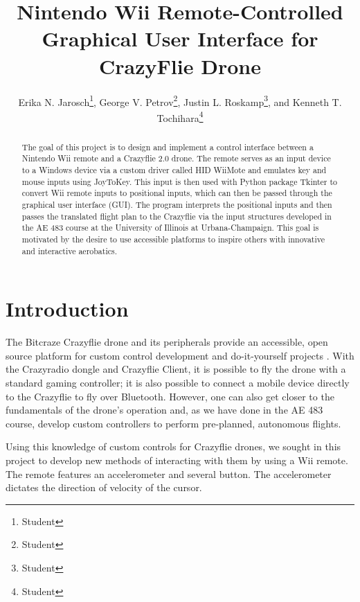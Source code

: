 \documentclass[conf]{new-aiaa}
\title{Nintendo Wii Remote-Controlled Graphical User Interface for CrazyFlie Drone}
\author{Erika N. Jarosch\footnote{Student}, George V. Petrov\footnote{Student}, Justin L. Roskamp\footnote{Student}, and Kenneth T. Tochihara\footnote{Student}}
\affil{University of Illinois at Urbana-Champaign, Urbana, IL, 61820}
\begin{document}
\maketitle
\makenomenclature

\begin{abstract} 
    The goal of this project is to design and implement a control interface between a Nintendo Wii remote and a Crazyflie 2.0 drone. The remote serves as an input device to a Windows device via a custom driver called HID WiiMote and emulates key and mouse inputs using JoyToKey. This input is then used with Python package Tkinter to convert Wii remote inputs to positional inputs, which can then be passed through the graphical user interface (GUI). The program interprets the positional inputs and then passes the translated flight plan to the Crazyflie via the input structures developed in the AE 483 course at the University of Illinois at Urbana-Champaign. This goal is motivated by the desire to use accessible platforms to inspire others with innovative and interactive aerobatics.

\end{abstract}

\mbox{}
\printnomenclature

\section{Introduction}

    The Bitcraze Crazyflie drone and its peripherals provide an accessible, open source platform for custom control development and do-it-yourself projects \cite{cfclient}. With the Crazyradio dongle and Crazyflie Client, it is possible to fly the drone with a standard gaming controller; it is also possible to connect a mobile device directly to the Crazyflie to fly over Bluetooth. However, one can also get closer to the fundamentals of the drone's operation and, as we have done in the AE 483 course, develop custom controllers to perform pre-planned, autonomous flights.
    
    Using this knowledge of custom controls for Crazyflie drones, we sought in this project to develop new methods of interacting with them by using a Wii remote. The remote features an accelerometer and several button. The accelerometer dictates the direction of velocity of the cursor. 
    
\end{document}
